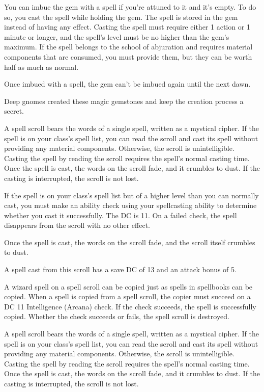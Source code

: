 \documentclass[10pt,a4paper,twoside,bg=print,twocolumn,openany,nodeprecatedcode]{dndbook}
\begin{document}
You can imbue the gem with a spell if you're attuned to it and it's empty. To do so, you cast the spell while holding the gem. The spell is stored in the gem instead of having any effect. Casting the spell must require either 1 action or 1 minute or longer, and the spell's level must be no higher than the gem's maximum. If the spell belongs to the school of abjuration and requires material components that are consumed, you must provide them, but they can be worth half as much as normal.

Once imbued with a spell, the gem can't be imbued again until the next dawn.

Deep gnomes created these magic gemstones and keep the creation process a secret.

A spell scroll bears the words of a single spell, written as a mystical cipher. If the spell is on your class's spell list, you can read the scroll and cast its spell without providing any material components. Otherwise, the scroll is unintelligible. Casting the spell by reading the scroll requires the spell's normal casting time. Once the spell is cast, the words on the scroll fade, and it crumbles to dust. If the casting is interrupted, the scroll is not lost.

If the spell is on your class's spell list but of a higher level than you can normally cast, you must make an ability check using your spellcasting ability to determine whether you cast it successfully. The DC is 11. On a failed check, the spell disappears from the scroll with no other effect.

Once the spell is cast, the words on the scroll fade, and the scroll itself crumbles to dust.

A spell cast from this scroll has a save DC of 13 and an attack bonus of 5.

A wizard spell on a spell scroll can be copied just as spells in spellbooks can be copied. When a spell is copied from a spell scroll, the copier must succeed on a DC 11 Intelligence (Arcana) check. If the check succeeds, the spell is successfully copied. Whether the check succeeds or fails, the spell scroll is destroyed.

A spell scroll bears the words of a single spell, written as a mystical cipher. If the spell is on your class's spell list, you can read the scroll and cast its spell without providing any material components. Otherwise, the scroll is unintelligible. Casting the spell by reading the scroll requires the spell's normal casting time. Once the spell is cast, the words on the scroll fade, and it crumbles to dust. If the casting is interrupted, the scroll is not lost.
\end{document}
